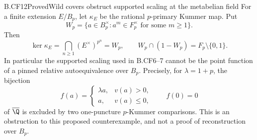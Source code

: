 \begin{claim}{B.CF12}{Proved}{Wild covers obstruct supported scaling at the metabelian field}
For a finite extension \(E/B_p\), let \(\kappa_E\) be the rational
\(p\)-primary Kummer map. Put
\[
 W_p=\{a\in B_p^\times:a^m\in F_p^\times
                         \text{ for some }m\geq1\}.
\]
Then
\[
 \ker\kappa_E=\bigcap_{n\geq1}(E^\times)^{p^n}=W_p,
 \qquad W_p\cap(1-W_p)=F_p\setminus\{0,1\}.             \tag{B.MIX.2}
\]
In particular the supported scaling used in B.CF6--7 cannot be the
point function of a pinned relative autoequivalence over \(B_p\).
Precisely, for \(\lambda=1+p\), the bijection
\[
 f(a)=\begin{cases}\lambda a,&v(a)>0,\\a,&v(a)\leq0,
                         \end{cases}\qquad f(0)=0
                                                        \tag{B.MIX.3}
\]
of \(\overline\Q\) is excluded by two one-puncture
\(p\)-Kummer comparisons. This is an obstruction to this proposed
counterexample, and not a proof of reconstruction over \(B_p\).
\end{claim}
